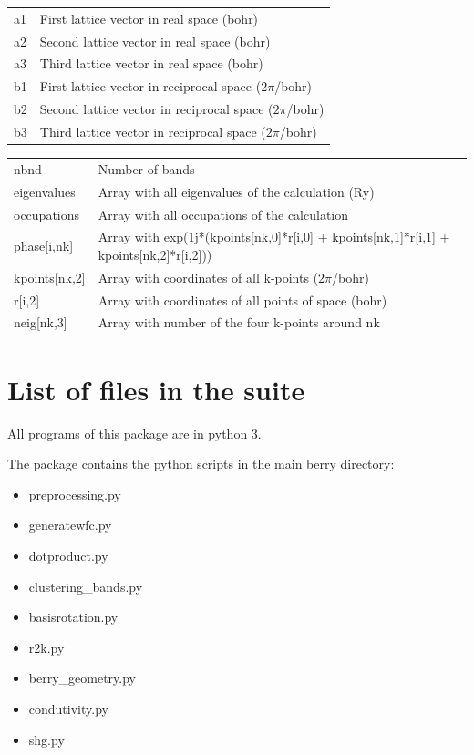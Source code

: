 \documentclass[a4paper,12pt]{report}
\begin{document}
\begin{appendices}
\begin{tabularx}{\textwidth}{Xl}
 a1             & First lattice vector in real space (bohr) \\
 a2             & Second lattice vector in real space (bohr) \\
 a3             & Third lattice vector in real space (bohr) \\

 b1             & First lattice vector in reciprocal space ($2\pi$/bohr) \\
 b2             & Second lattice vector in reciprocal space ($2\pi$/bohr) \\
 b3             & Third lattice vector in reciprocal space ($2\pi$/bohr) \\
\end{tabularx}
\vspace{0.5cm}

\hspace*{-2cm}\begin{tabularx}{\textwidth}{ll}
 nbnd           & Number of bands \\

 eigenvalues    & Array with all eigenvalues of the calculation (Ry) \\
 occupations    & Array with all occupations of the calculation \\

 phase[i,nk]    & Array with exp(1j*(kpoints[nk,0]*r[i,0] + kpoints[nk,1]*r[i,1] + kpoints[nk,2]*r[i,2])) \\
 kpoints[nk,2]  & Array with coordinates of all k-points ($2\pi$/bohr) \\
 r[i,2]         & Array with coordinates of all points of space (bohr) \\

 neig[nk,3]     & Array with number of the four k-points around nk \\
\end{tabularx}


\chapter{List of files in the suite}
 All programs of this package are in python 3.

The package contains the python scripts in the main berry directory:
\begin{itemize}
 \item preprocessing.py
 \item generatewfc.py
 \item dotproduct.py
 \item clustering\_bands.py
 \item basisrotation.py
 \item r2k.py
 \item berry\_geometry.py
 \item condutivity.py
 \item shg.py
\end{itemize}\medskip


\end{appendices}
\end{document}
